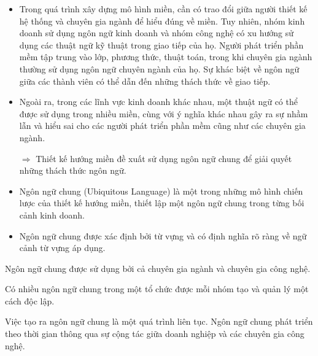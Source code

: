 




\begin{itemize}
    \item Trong quá trình xây dựng mô hình miền, cần có     trao đổi giữa   người thiết kế hệ thống   và chuyên gia ngành để hiểu đúng về miền. Tuy nhiên, nhóm kinh doanh sử dụng ngôn ngữ kinh doanh và nhóm công nghệ có xu hướng sử dụng các thuật ngữ kỹ thuật trong giao tiếp của họ. Người phát triển phần mềm tập trung vào lớp, phương thức, thuật toán, trong khi chuyên gia ngành thường sử dụng ngôn ngữ chuyên ngành của họ. Sự khác biệt về ngôn ngữ giữa các thành viên có thể dẫn đến những thách thức về giao tiếp.
    \item Ngoài ra, trong các lĩnh vực kinh doanh khác nhau, một thuật ngữ có thể được sử dụng trong nhiều miền, cùng với ý nghĩa khác nhau gây ra sự nhầm lẫn và hiểu sai cho các người phát triển phần mềm cũng như các chuyên gia ngành.

          $\Rightarrow$ Thiết kế hướng miền đề xuất sử dụng ngôn ngữ chung để giải quyết những thách thức ngôn ngữ.
    \item  Ngôn ngữ chung (Ubiquitous Language) là một trong những mô hình chiến lược của thiết kế hướng miền, thiết lập một ngôn ngữ chung trong từng bối cảnh kinh doanh.


    \item Ngôn ngữ chung được xác định bởi từ vựng và có định nghĩa rõ ràng về ngữ cảnh từ vựng áp dụng.
\end{itemize}








Ngôn ngữ chung được sử dụng bởi cả chuyên gia ngành và chuyên gia công nghệ.

Có nhiều ngôn ngữ chung trong một tổ chức được mỗi nhóm tạo và quản lý một cách độc lập.

Việc tạo ra ngôn ngữ chung là một quá trình liên tục. Ngôn ngữ chung phát triển theo thời gian thông qua sự cộng tác giữa doanh nghiệp và các chuyên gia công nghệ.

